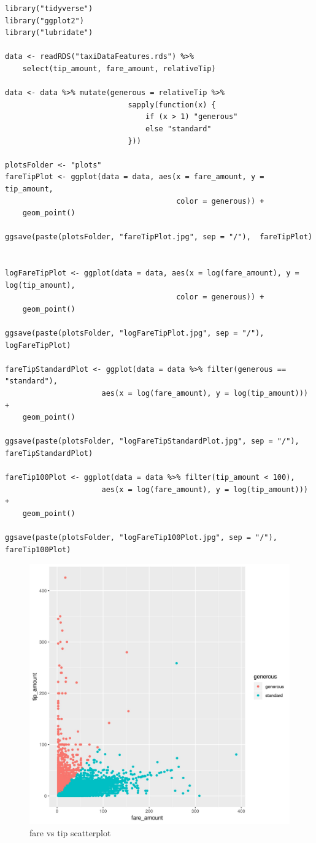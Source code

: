 \documentclass[11pt]{article}
\begin{document}
\begin{verbatim}
library("tidyverse")
library("ggplot2")
library("lubridate")

data <- readRDS("taxiDataFeatures.rds") %>%
    select(tip_amount, fare_amount, relativeTip)

data <- data %>% mutate(generous = relativeTip %>%
                            sapply(function(x) {
                                if (x > 1) "generous"
                                else "standard"
                            }))

plotsFolder <- "plots"
fareTipPlot <- ggplot(data = data, aes(x = fare_amount, y = tip_amount,
                                       color = generous)) +
    geom_point()

ggsave(paste(plotsFolder, "fareTipPlot.jpg", sep = "/"),  fareTipPlot)


logFareTipPlot <- ggplot(data = data, aes(x = log(fare_amount), y = log(tip_amount),
                                       color = generous)) +
    geom_point()

ggsave(paste(plotsFolder, "logFareTipPlot.jpg", sep = "/"),  logFareTipPlot)

fareTipStandardPlot <- ggplot(data = data %>% filter(generous == "standard"),
                      aes(x = log(fare_amount), y = log(tip_amount))) +
    geom_point()

ggsave(paste(plotsFolder, "logFareTipStandardPlot.jpg", sep = "/"),  fareTipStandardPlot)

fareTip100Plot <- ggplot(data = data %>% filter(tip_amount < 100),
                      aes(x = log(fare_amount), y = log(tip_amount))) +
    geom_point()

ggsave(paste(plotsFolder, "logFareTip100Plot.jpg", sep = "/"),  fareTip100Plot)
\end{verbatim}
\begin{figure}[htbp]
\centering
\includegraphics[width=.9\linewidth]{./plots/fareTipPlot.jpg}
\caption{\label{fig:org3d65f2e}
fare vs tip scatterplot}
\end{figure}
\end{document}
